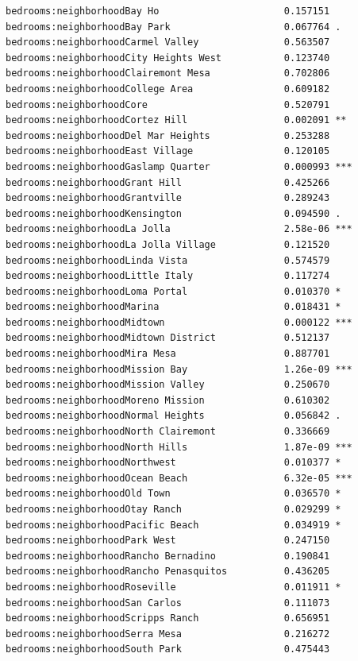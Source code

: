 \documentclass[
  letterpaper,
  DIV=11,
  numbers=noendperiod,
  oneside]{scrreprt}
\begin{document}
\begin{verbatim}
bedrooms:neighborhoodBay Ho                      0.157151    
bedrooms:neighborhoodBay Park                    0.067764 .  
bedrooms:neighborhoodCarmel Valley               0.563507    
bedrooms:neighborhoodCity Heights West           0.123740    
bedrooms:neighborhoodClairemont Mesa             0.702806    
bedrooms:neighborhoodCollege Area                0.609182    
bedrooms:neighborhoodCore                        0.520791    
bedrooms:neighborhoodCortez Hill                 0.002091 ** 
bedrooms:neighborhoodDel Mar Heights             0.253288    
bedrooms:neighborhoodEast Village                0.120105    
bedrooms:neighborhoodGaslamp Quarter             0.000993 ***
bedrooms:neighborhoodGrant Hill                  0.425266    
bedrooms:neighborhoodGrantville                  0.289243    
bedrooms:neighborhoodKensington                  0.094590 .  
bedrooms:neighborhoodLa Jolla                    2.58e-06 ***
bedrooms:neighborhoodLa Jolla Village            0.121520    
bedrooms:neighborhoodLinda Vista                 0.574579    
bedrooms:neighborhoodLittle Italy                0.117274    
bedrooms:neighborhoodLoma Portal                 0.010370 *  
bedrooms:neighborhoodMarina                      0.018431 *  
bedrooms:neighborhoodMidtown                     0.000122 ***
bedrooms:neighborhoodMidtown District            0.512137    
bedrooms:neighborhoodMira Mesa                   0.887701    
bedrooms:neighborhoodMission Bay                 1.26e-09 ***
bedrooms:neighborhoodMission Valley              0.250670    
bedrooms:neighborhoodMoreno Mission              0.610302    
bedrooms:neighborhoodNormal Heights              0.056842 .  
bedrooms:neighborhoodNorth Clairemont            0.336669    
bedrooms:neighborhoodNorth Hills                 1.87e-09 ***
bedrooms:neighborhoodNorthwest                   0.010377 *  
bedrooms:neighborhoodOcean Beach                 6.32e-05 ***
bedrooms:neighborhoodOld Town                    0.036570 *  
bedrooms:neighborhoodOtay Ranch                  0.029299 *  
bedrooms:neighborhoodPacific Beach               0.034919 *  
bedrooms:neighborhoodPark West                   0.247150    
bedrooms:neighborhoodRancho Bernadino            0.190841    
bedrooms:neighborhoodRancho Penasquitos          0.436205    
bedrooms:neighborhoodRoseville                   0.011911 *  
bedrooms:neighborhoodSan Carlos                  0.111073    
bedrooms:neighborhoodScripps Ranch               0.656951    
bedrooms:neighborhoodSerra Mesa                  0.216272    
bedrooms:neighborhoodSouth Park                  0.475443    

\end{verbatim}
\end{document}
